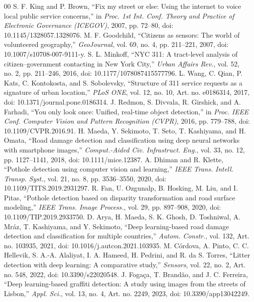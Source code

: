 \documentclass{ieeeaccess}
\begin{document}
\begin{thebibliography}{00}
 S. F. King and P. Brown, ``Fix my street or else: Using the internet to voice local public service concerns,'' in \textit{Proc. 1st Int. Conf. Theory and Practice of Electronic Governance (ICEGOV)}, 2007, pp. 72--80, doi: 10.1145/1328057.1328076.
 M. F. Goodchild, ``Citizens as sensors: The world of volunteered geography,'' \textit{GeoJournal}, vol. 69, no. 4, pp. 211--221, 2007, doi: 10.1007/s10708-007-9111-y.
 S. L. Minkoff, ``NYC 311: A tract-level analysis of citizen--government contacting in New York City,'' \textit{Urban Affairs Rev.}, vol. 52, no. 2, pp. 211--246, 2016, doi: 10.1177/1078087415577796.
 L. Wang, C. Qian, P. Kats, C. Kontokosta, and S. Sobolevsky, ``Structure of 311 service requests as a signature of urban location,'' \textit{PLoS ONE}, vol. 12, no. 10, Art. no. e0186314, 2017, doi: 10.1371/journal.pone.0186314.
 J. Redmon, S. Divvala, R. Girshick, and A. Farhadi, ``You only look once: Unified, real-time object detection,'' in \textit{Proc. IEEE Conf. Computer Vision and Pattern Recognition (CVPR)}, 2016, pp. 779--788, doi: 10.1109/CVPR.2016.91.
 H. Maeda, Y. Sekimoto, T. Seto, T. Kashiyama, and H. Omata, ``Road damage detection and classification using deep neural networks with smartphone images,'' \textit{Comput.-Aided Civ. Infrastruct. Eng.}, vol. 33, no. 12, pp. 1127--1141, 2018, doi: 10.1111/mice.12387.
 A. Dhiman and R. Klette, ``Pothole detection using computer vision and learning,'' \textit{IEEE Trans. Intell. Transp. Syst.}, vol. 21, no. 8, pp. 3536--3550, 2020, doi: 10.1109/TITS.2019.2931297.
 R. Fan, U. Ozgunalp, B. Hosking, M. Liu, and I. Pitas, ``Pothole detection based on disparity transformation and road surface modeling,'' \textit{IEEE Trans. Image Process.}, vol. 29, pp. 897--908, 2020, doi: 10.1109/TIP.2019.2933750.
 D. Arya, H. Maeda, S. K. Ghosh, D. Toshniwal, A. Mráz, T. Kashiyama, and Y. Sekimoto, ``Deep learning-based road damage detection and classification for multiple countries,'' \textit{Autom. Constr.}, vol. 132, Art. no. 103935, 2021, doi: 10.1016/j.autcon.2021.103935.
 M. Córdova, A. Pinto, C. C. Hellevik, S. A.-A. Alaliyat, I. A. Hameed, H. Pedrini, and R. da S. Torres, ``Litter detection with deep learning: A comparative study,'' \textit{Sensors}, vol. 22, no. 2, Art. no. 548, 2022, doi: 10.3390/s22020548.
 J. Fogaça, T. Brandão, and J. C. Ferreira, ``Deep learning-based graffiti detection: A study using images from the streets of Lisbon,'' \textit{Appl. Sci.}, vol. 13, no. 4, Art. no. 2249, 2023, doi: 10.3390/app13042249.

\end{thebibliography}
\end{document}
